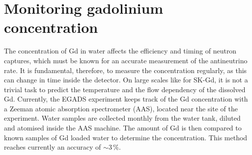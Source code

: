 



\section{Monitoring gadolinium concentration}
\label{sec:gad}

The concentration of Gd in water affects the efficiency and timing of neutron captures, %
which must be known for an accurate measurement of the antineutrino rate.
It is fundamental, therefore, to measure the concentration regularly, as this can change in time inside the detector.
On large scales like for SK-Gd, it is not a trivial task to predict the temperature and the flow dependency %
of the dissolved Gd.
Currently, the EGADS experiment keeps track of the Gd concentration with a Zeeman atomic absorption spectrometer (AAS), %
located near the site of the experiment.
Water samples are collected monthly from the water tank, diluted and atomised inside the AAS machine.
The amount of Gd is then compared to known samples of Gd loaded water to determine the concentration.
This method reaches currently an accuracy of $\sim3$\,\%.

